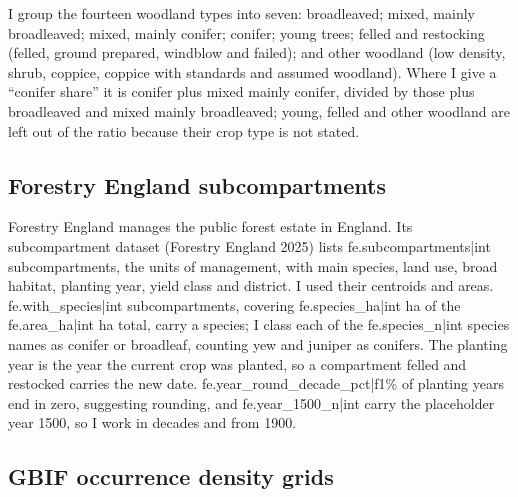 \documentclass[11pt,a4paper]{article}
\begin{document}
I group the fourteen woodland types into seven: broadleaved; mixed, mainly broadleaved; mixed, mainly conifer; conifer; young trees; felled and restocking (felled, ground prepared, windblow and failed); and other woodland (low density, shrub, coppice, coppice with standards and assumed woodland). Where I give a ``conifer share'' it is conifer plus mixed mainly conifer, divided by those plus broadleaved and mixed mainly broadleaved; young, felled and other woodland are left out of the ratio because their crop type is not stated.

\subsection{Forestry England subcompartments}

Forestry England manages the public forest estate in England. Its subcompartment dataset (Forestry England 2025) lists {{fe.subcompartments|int}} subcompartments, the units of management, with main species, land use, broad habitat, planting year, yield class and district. I used their centroids and areas. {{fe.with_species|int}} subcompartments, covering {{fe.species_ha|int}} ha of the {{fe.area_ha|int}} ha total, carry a species; I class each of the {{fe.species_n|int}} species names as conifer or broadleaf, counting yew and juniper as conifers. The planting year is the year the current crop was planted, so a compartment felled and restocked carries the new date. {{fe.year_round_decade_pct|f1}}\% of planting years end in zero, suggesting rounding, and {{fe.year_1500_n|int}} carry the placeholder year 1500, so I work in decades and from 1900.

\subsection{GBIF occurrence density grids}
\end{document}
